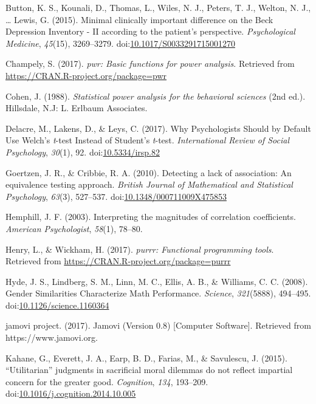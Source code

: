 \documentclass[english,floatsintext,man]{apa6}
\theoremstyle{definition}
\theoremstyle{definition}
\theoremstyle{definition}
\theoremstyle{remark}
\begin{document}
\hypertarget{ref-Button2015}{}
Button, K. S., Kounali, D., Thomas, L., Wiles, N. J., Peters, T. J.,
Welton, N. J., \ldots{} Lewis, G. (2015). Minimal clinically important
difference on the Beck Depression Inventory - II according to the
patient's perspective. \emph{Psychological Medicine}, \emph{45}(15),
3269--3279.
doi:\href{https://doi.org/10.1017/S0033291715001270}{10.1017/S0033291715001270}

\hypertarget{ref-R-pwr}{}
Champely, S. (2017). \emph{pwr: Basic functions for power analysis}.
Retrieved from \url{https://CRAN.R-project.org/package=pwr}

\hypertarget{ref-Cohen1988}{}
Cohen, J. (1988). \emph{Statistical power analysis for the behavioral
sciences} (2nd ed.). Hillsdale, N.J: L. Erlbaum Associates.

\hypertarget{ref-Delacre2017}{}
Delacre, M., Lakens, D., \& Leys, C. (2017). Why Psychologists Should by
Default Use Welch's \emph{t}-test Instead of Student's \emph{t}-test.
\emph{International Review of Social Psychology}, \emph{30}(1), 92.
doi:\href{https://doi.org/10.5334/irsp.82}{10.5334/irsp.82}

\hypertarget{ref-Goertzen2010}{}
Goertzen, J. R., \& Cribbie, R. A. (2010). Detecting a lack of
association: An equivalence testing approach. \emph{British Journal of
Mathematical and Statistical Psychology}, \emph{63}(3), 527--537.
doi:\href{https://doi.org/10.1348/000711009X475853}{10.1348/000711009X475853}

\hypertarget{ref-Hemphill2003}{}
Hemphill, J. F. (2003). Interpreting the magnitudes of correlation
coefficients. \emph{American Psychologist}, \emph{58}(1), 78--80.

\hypertarget{ref-R-purrr}{}
Henry, L., \& Wickham, H. (2017). \emph{purrr: Functional programming
tools}. Retrieved from \url{https://CRAN.R-project.org/package=purrr}

\hypertarget{ref-Hyde2008}{}
Hyde, J. S., Lindberg, S. M., Linn, M. C., Ellis, A. B., \& Williams, C.
C. (2008). Gender Similarities Characterize Math Performance.
\emph{Science}, \emph{321}(5888), 494--495.
doi:\href{https://doi.org/10.1126/science.1160364}{10.1126/science.1160364}

\hypertarget{ref-jamovi2017}{}
jamovi project. (2017). Jamovi (Version 0.8) {[}Computer Software{]}.
Retrieved from https://www.jamovi.org.

\hypertarget{ref-Kahane2015}{}
Kahane, G., Everett, J. A., Earp, B. D., Farias, M., \& Savulescu, J.
(2015). ``Utilitarian'' judgments in sacrificial moral dilemmas do not
reflect impartial concern for the greater good. \emph{Cognition},
\emph{134}, 193--209.
doi:\href{https://doi.org/10.1016/j.cognition.2014.10.005}{10.1016/j.cognition.2014.10.005}
\end{document}
